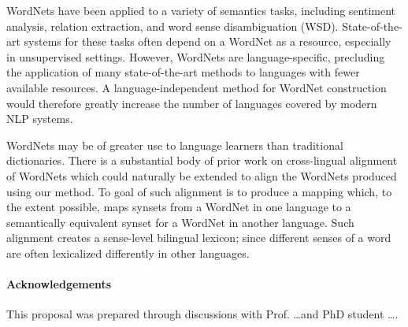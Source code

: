 \documentclass[12pt]{article}
\begin{document}
WordNets have been applied to a variety of semantics tasks, including
sentiment analysis, relation extraction, and word sense disambiguation (WSD).
State-of-the-art systems for these tasks 
often depend on a WordNet as a resource,
especially in unsupervised settings.
However, WordNets are language-specific,
precluding the application of many state-of-the-art methods
to languages with fewer available resources.
A language-independent method
for WordNet construction
would therefore greatly increase the number of languages
covered by modern NLP systems.

WordNets may be of greater use to language learners than traditional
dictionaries.
There is a substantial body of prior work on cross-lingual
alignment of WordNets %
which could naturally be extended to align the WordNets produced
using our method.
To goal of such alignment is to produce a mapping which,
to the extent possible, maps synsets from a WordNet in one language
to a semantically equivalent synset for a WordNet in another language.
Such alignment creates a sense-level bilingual lexicon;
since different senses of a word are 
often lexicalized differently in other languages.





\newpage
\noindent
\paragraph{Acknowledgements}
This proposal was prepared through discussions 
with Prof. \ldots and PhD student \ldots. 




\end{document}
